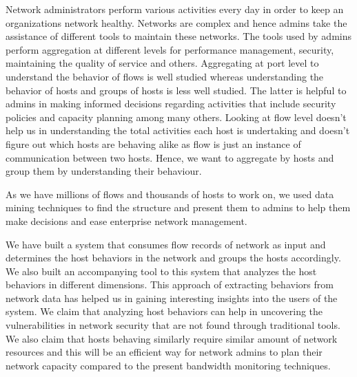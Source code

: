 
Network administrators perform various activities every day in order to keep an organizations network healthy. Networks are complex and hence admins take the assistance of different tools to maintain these networks. The tools used by admins perform aggregation at different levels for performance management, security, maintaining the quality of service and others. Aggregating at port level to understand the behavior of flows is well studied whereas understanding the
behavior of hosts and groups of hosts is less well studied. The latter is helpful to admins in making
informed decisions regarding activities that include security policies and capacity planning among
many others. Looking at flow level doesn’t help us in understanding the total activities each host is
undertaking and doesn’t figure out which hosts are behaving alike as flow is just an instance of
communication between two hosts. Hence, we want to aggregate by hosts and group them by
understanding their behaviour.

As we have millions of flows and thousands of hosts to work on, we used data mining techniques to find the structure and present them to admins to help them
make decisions and ease enterprise network management.

We have built a system that consumes flow records of network as input and determines the host behaviors in the network and groups the hosts accordingly. We also built an accompanying tool to this system that analyzes the host behaviors in different dimensions. This approach of extracting behaviors from network data has helped us in gaining interesting insights into the users of the system. We claim that analyzing host behaviors can help in uncovering the vulnerabilities in network security that are not found through traditional tools. We also claim that hosts behaving similarly require similar amount of network resources and this will be an efficient way for network admins to plan their network capacity compared to the present bandwidth monitoring techniques.   